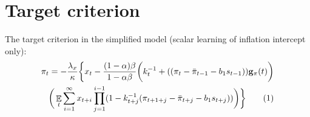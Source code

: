 \documentclass[11pt]{article}
\renewcommand{\[}{\begin{equation}}
\renewcommand{\]}{\end{equation}}
\DeclareMathOperator{\E}{\mathbb{E}}
\newcommand\numberthis{\addtocounter{equation}{1}\tag{\theequation}} %
\begin{document}
\section{Target criterion}
The target criterion in the simplified model (scalar learning of inflation intercept only):
\begin{align*}
\pi_t  = -\frac{\lambda_x}{\kappa}\bigg\{x_t - \frac{(1-\alpha)\beta}{1-\alpha\beta} \bigg(k_t^{-1}+((\pi_t - \bar{\pi}_{t-1}-b_1 s_{t-1}))\mathbf{g}_{\pi}(t) \bigg) \\
\bigg(\E_t\sum_{i=1}^{\infty}x_{t+i}\prod_{j=1}^{i-1}(1-k_{t+j}^{-1}(\pi_{t+1+j} - \bar{\pi}_{t+j}-b_1 s_{t+j})) \bigg)
\bigg\} \numberthis \label{target}
\end{align*}
\end{document}
